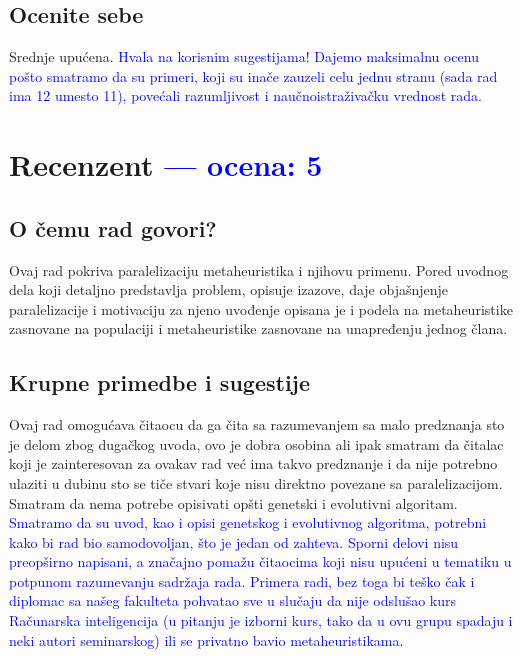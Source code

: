 \documentclass[a4paper]{report}
\newcommand{\odgovor}[1]{\textcolor{blue}{#1}}
\begin{document}
\section{Ocenite sebe}
Srednje upućena. \odgovor{Hvala na korisnim sugestijama! Dajemo maksimalnu ocenu pošto smatramo da su primeri, koji su inače zauzeli celu jednu stranu (sada rad ima 12 umesto 11), povećali razumljivost i naučnoistraživačku vrednost rada.}

\chapter{Recenzent \odgovor{--- ocena: 5} }


\section{O čemu rad govori?}
Ovaj rad pokriva paralelizaciju metaheuristika i njihovu primenu. Pored uvodnog dela koji detaljno predstavlja problem, opisuje izazove, daje objašnjenje paralelizacije i motivaciju za njeno uvođenje opisana je i podela na metaheuristike zasnovane na populaciji  i  metaheuristike zasnovane na unapređenju jednog člana. 
\section{Krupne primedbe i sugestije}

Ovaj rad omogućava čitaocu da ga čita sa razumevanjem sa malo predznanja sto je delom zbog dugačkog uvoda, ovo je dobra osobina ali ipak smatram da čitalac koji je zainteresovan za ovakav rad već ima takvo predznanje i da nije potrebno ulaziti u dubinu sto se tiče stvari koje nisu direktno povezane sa paralelizacijom. Smatram da nema potrebe opisivati opšti genetski i evolutivni algoritam.
\odgovor{Smatramo da su uvod, kao i opisi genetskog i evolutivnog algoritma, potrebni kako bi rad bio samodovoljan, što je jedan od zahteva. Sporni delovi nisu preopširno napisani, a značajno pomažu čitaocima koji nisu upućeni u tematiku u potpunom razumevanju sadržaja rada. Primera radi, bez toga bi teško čak i diplomac sa našeg fakulteta pohvatao sve u slučaju da nije odslušao kurs Računarska inteligencija (u pitanju je izborni kurs, tako da u ovu grupu spadaju i neki autori seminarskog) ili se privatno bavio metaheuristikama.}
\end{document}
